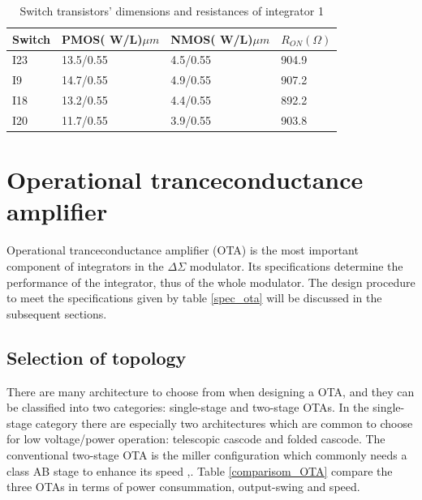 \begin{table}[ht]
\centering
\caption{Switch transistors' dimensions and resistances of integrator 1}
\label{R_on_1}
\begin{tabular}{|l|l|l|l|}
\hline
Switch & PMOS( W/L)$\mu m$ & NMOS( W/L)$\mu m$ & $R_{ON} (\Omega)$   \\ \hline
I23    & 13.5/0.55  & 4.5/0.55   & 904.9 \\ \hline
I9     & 14.7/0.55  & 4.9/0.55   & 907.2 \\ \hline
I18    & 13.2/0.55  & 4.4/0.55   & 892.2 \\ \hline
I20    & 11.7/0.55  & 3.9/0.55   & 903.8 \\ \hline
\end{tabular}
\end{table}

\section{Operational tranceconductance amplifier}

Operational tranceconductance amplifier (OTA) is the most important component of integrators in the $\Delta\Sigma$ modulator. Its specifications determine the performance of the integrator, thus of the whole modulator. The design procedure to meet the specifications given by table \ref{spec_ota} will be discussed in the subsequent sections. 

\subsection{Selection of topology}
There are many architecture to choose from when designing a OTA, and they can be classified into two categories: single-stage and two-stage OTAs. In the single-stage category there are especially two architectures which are common to choose for low voltage/power operation: telescopic cascode and folded cascode. The conventional two-stage OTA is the miller configuration which commonly needs a class AB stage to enhance its speed \cite{two_stage_1},\cite{two_stage_2}. Table \ref{comparisom_OTA} compare the three OTAs in terms of power consummation, output-swing and speed.

